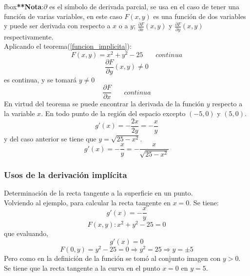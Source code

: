 \documentclass[10pt,twoside]{SelfArx} %
\begin{document}
fbox{\textbf{**Nota}:$ \partial $ es el símbolo de derivada parcial, se usa en el caso de tener una función de varias variables, en este caso $ F(x,y) $ es una función de dos variables y puede ser derivada con respecto a $ x $ o a $ y $; $ \frac{\partial F}{\partial x}(x,y) $ y $ \frac{\partial F}{\partial y}(x,y)  $ respectivamente.}\\

Aplicando el teorema(\ref{funcion_implicita}):\\
\begin{equation}
 F(x,y)=x^{2}+y^{2}-25\,\,\,\,\,\,\,\,\,\,\, continua 
\end{equation}
\begin{equation}
 \frac{\partial F}{\partial y}(x,y)\neq0  
\end{equation}
es continua, y se tomar\'a $ y\neq0 $
\begin{equation}
 \dfrac{\partial F}{\partial x} \,\,\,\,\,\,\,\,\,\,\, continua 
\end{equation}
	En virtud del teorema se puede encontrar la derivada de la función $ y $ respecto a la variable $ x $. En todo punto de la región del espacio excepto $ (-5,0) $ y $ (5,0) $.\\
\begin{equation}
	 g'(x)=-\frac{2x}{2y}=-\frac{x}{y} 
\end{equation}
y del caso anterior se tiene que $ y=\sqrt{25-x^{2}} $.\\
\begin{equation}
	 g'(x)=-\frac{x}{y}=-\frac{x}{\sqrt{25-x^{2}}} 
\end{equation}
	
\subsubsection{Usos de la derivación implícita}
	Determinación de la recta tangente a la superficie en un punto.\\
	Volviendo al ejemplo, para calcular la recta tangente en $ x=0 $.
	 Se tiene:
\begin{equation}
	  g'(x)=-\frac{x}{y} 
\end{equation}
\begin{equation}
	  F(x,y):x^{2}+y^{2}-25=0 
\end{equation}
	 que evaluando,
\begin{equation}
	 g'(x)=0 
\end{equation}
\begin{equation}
	  F(0,y)=y^{2}-25=0\Rightarrow y^{2}=25\Rightarrow y=\pm5 
\end{equation}
	 Pero como en la definición de la función se tomó al conjunto imagen con $ y>0 $. Se tiene que la recta tangente a la curva en el punto $ x=0 $ en $ y=5 $.
	
\end{document}
